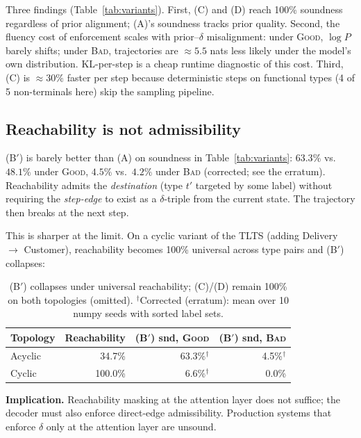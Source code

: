 \documentclass[preprint]{nesy2026}
\begin{document}
Three findings (Table~\ref{tab:variants}). First, (C) and (D) reach
100\% soundness regardless of prior alignment; (A)'s soundness
tracks prior quality. Second, the fluency cost of enforcement scales
with prior--$\delta$ misalignment: under \textsc{Good}, $\log P$
barely shifts; under \textsc{Bad}, trajectories are $\approx 5.5$
nats less likely under the model's own distribution. KL-per-step is
a cheap runtime diagnostic of this cost. Third, (C) is $\approx
30\%$ faster per step because deterministic steps on functional
types (4 of 5 non-terminals here) skip the sampling pipeline.

\subsection{Reachability is not admissibility}
\label{ssec:reach}

(B$'$) is barely better than (A) on soundness in
Table~\ref{tab:variants}: $63.3\%$ vs.\ $48.1\%$ under \textsc{Good},
$4.5\%$ vs.\ $4.2\%$ under \textsc{Bad} (corrected; see the erratum). Reachability admits the
\emph{destination} (type $t'$ targeted by some label) without
requiring the \emph{step-edge} to exist as a $\delta$-triple from
the current state. The trajectory then breaks at the next step.

This is sharper at the limit. On a cyclic variant of the TLTS
(adding Delivery $\to$ Customer), reachability becomes 100\%
universal across type pairs and (B$'$) collapses:

\begin{table}[h]
\centering
\small
\begin{tabular}{@{}lrrr@{}}
\toprule
Topology & Reachability & (B$'$) snd, \textsc{Good} & (B$'$) snd, \textsc{Bad} \\
\midrule
Acyclic &   34.7\% &  63.3\%$^\dagger$ & 4.5\%$^\dagger$ \\
Cyclic  & 100.0\% &   6.6\%$^\dagger$ & 0.0\% \\
\bottomrule
\end{tabular}
\caption{(B$'$) collapses under universal reachability; (C)/(D)
remain 100\% on both topologies (omitted). $^\dagger$Corrected (erratum): mean over 10 numpy seeds with sorted label sets.}
\label{tab:cyclic}
\end{table}

\textbf{Implication.} Reachability masking at the attention layer
does not suffice; the decoder must also enforce direct-edge
admissibility. Production systems that enforce $\delta$ only at the
attention layer are unsound.
\end{document}
